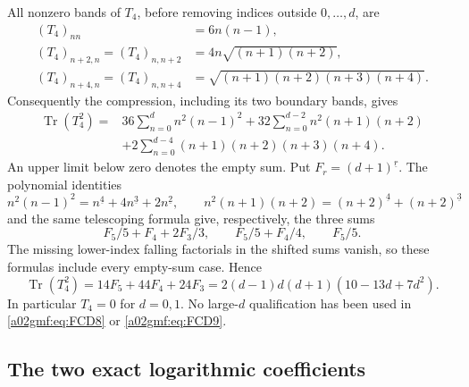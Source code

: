 \documentclass[11pt,a4paper]{article}
\begin{document}
All nonzero bands of \(T_4\), before removing indices outside \(0,\ldots,d\),
are
\[
 \begin{split}
 (T_4)_{nn}&=6n(n-1),\\
 (T_4)_{n+2,n}=(T_4)_{n,n+2}
       &=4n\sqrt{(n+1)(n+2)},\\
 (T_4)_{n+4,n}=(T_4)_{n,n+4}
       &=\sqrt{(n+1)(n+2)(n+3)(n+4)} .
 \end{split}
\]
Consequently the compression, including its two boundary bands, gives
\[
 \begin{split}
 \operatorname{Tr}(T_4^2)
 ={}&36\sum_{n=0}^d n^2(n-1)^2
     +32\sum_{n=0}^{d-2}n^2(n+1)(n+2)\\
    &+2\sum_{n=0}^{d-4}(n+1)(n+2)(n+3)(n+4).
 \end{split}
\]
An upper limit below zero denotes the empty sum. Put
\(F_r=(d+1)^{\underline r}\). The polynomial identities
\[
 n^2(n-1)^2=n^{\underline4}+4n^{\underline3}+2n^{\underline2},
 \qquad
 n^2(n+1)(n+2)=(n+2)^{\underline4}+(n+2)^{\underline3}
\]
and the same telescoping formula give, respectively, the three sums
\[
 F_5/5+F_4+2F_3/3,\qquad F_5/5+F_4/4,\qquad F_5/5.
\]
The missing lower-index falling factorials in the shifted sums vanish, so
these formulas include every empty-sum case. Hence
\begin{equation}
 \boxed{\displaystyle
 \operatorname{Tr}(T_4^2)=14F_5+44F_4+24F_3
             =2(d-1)d(d+1)(10-13d+7d^2).}
 \tag{FCD9}\label{a02gmf:eq:FCD9}
\end{equation}
In particular \(T_4=0\) for \(d=0,1\). No large-\(d\) qualification
has been used in \eqref{a02gmf:eq:FCD8} or \eqref{a02gmf:eq:FCD9}.

\subsection{The two exact logarithmic coefficients}
\end{document}
